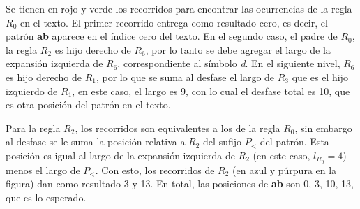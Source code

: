 Se tienen en rojo y verde los recorridos para encontrar las ocurrencias de la regla $R_0$ en el texto. El primer recorrido entrega como resultado cero, es decir, el patrón \textbf{ab} aparece en el índice cero del texto. En el segundo caso, el padre de $R_0$, la regla $R_2$ es hijo derecho de $R_6$, por lo tanto se debe agregar el largo de la expansión izquierda de $R_6$, correspondiente al símbolo \textit{d}. En el siguiente nivel, $R_6$ es hijo derecho de $R_1$, por lo que se suma al desfase el largo de $R_3$ que es el hijo izquierdo de $R_1$, en este caso, el largo es 9, con lo cual el desfase total es 10, que es otra posición del patrón en el texto.

Para la regla $R_2$, los recorridos son equivalentes a los de la regla $R_0$, sin embargo al desfase se le suma la posición relativa a $R_2$ del sufijo $P_<$ del patrón. Esta posición es igual al largo de la expansión izquierda de $R_2$ (en este caso, $l_{R_0} = 4$) menos el largo de $P_<$. Con esto, los recorridos de $R_2$ (en azul y púrpura en la figura) dan como resultado 3 y 13. En total, las posiciones de \textbf{ab} son 0, 3, 10, 13, que es lo esperado.



\fi











